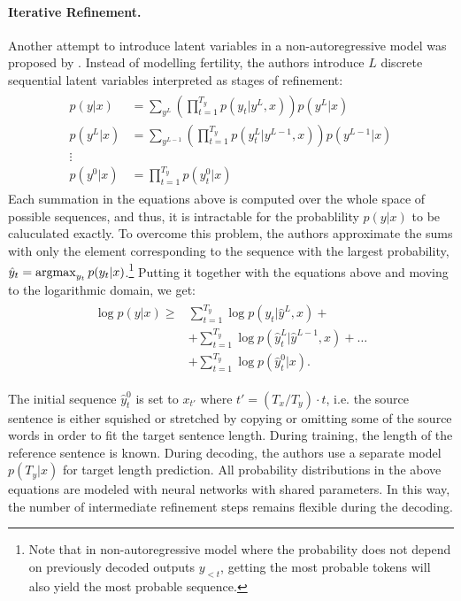 \paragraph{Iterative Refinement.} Another attempt to introduce latent variables
in a non-autoregressive model was proposed by
\citet{lee-etal-2018-deterministic}.  Instead of modelling fertility, the
authors introduce $L$ discrete sequential latent variables interpreted as
stages of refinement:
%
\begin{align}
  \begin{split}
    p(y|x) & = \sum_{y^L}
      \left( \prod_{t=1}^{T_y} p(y_t|y^L, x) \right) p(y^L|x) \\
    p(y^L|x) & = \sum_{y^{L-1}}
      \left( \prod_{t=1}^{T_y} p(y_t^L | y^{L-1}, x) \right)
      p(y^{L-1}|x) \\
    \vdots \\
    p(y^0|x) & = \prod_{t=1}^{T_y} p(y_t^0|x)
  \end{split}
\end{align}
%
Each summation in the equations above is computed over the whole space of
possible sequences, and thus, it is intractable for the probablility $p(y|x)$
to be caluculated exactly. To overcome this problem, the authors approximate
the sums with only the element corresponding to the sequence with the largest
probability, $\hat{y}_t = \operatorname*{argmax}_{y_t}p(y_t|x)$.\footnote{Note that in
  non-autoregressive model where the probability does not depend on previously
  decoded outputs $y_{<t}$, getting the most probable tokens will also yield
  the most probable sequence.}  Putting it together with the equations above
and moving to the logarithmic domain, we get:
\begin{align}
  \begin{split}
    \log p(y|x) \geq
    & \sum_{t=1}^{T_y} \log p(y_t| \hat{y}^L, x) + \\
    & + \sum_{t=1}^{T_y} \log p(\hat{y}_t^{L}| \hat{y}^{L-1}, x) + \ldots \\
    & + \sum_{t=1}^{T_y} \log p(\hat{y}_t^0 | x). \label{eq:refinement-lowerbound}
  \end{split}
\end{align}

The initial sequence $\hat{y}_t^0$ is set to $x_{t'}$ where
$t' = (T_x / T_y) \cdot t$, i.e. the source sentence is either squished or
stretched by copying or omitting some of the source words in order to fit the
target sentence length. During training, the length of the reference sentence
is known. During decoding, the authors use a separate model $p(T_y|x)$ for
target length prediction. All probability distributions in the above equations
are modeled with neural networks with shared parameters. In this way, the
number of intermediate refinement steps remains flexible during the decoding.


